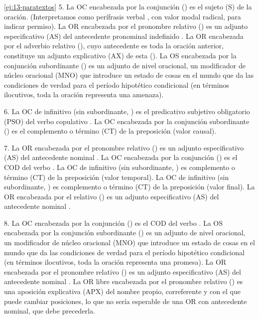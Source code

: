 \begin{solucion}{\ref{ej:13-paratextos}}
5. La OC encabezada por la conjunción  () es el sujeto (S) de la oración.
(Interpretamos como perífrasis verbal , con valor
modal radical, para indicar permiso). La OR encabezada por el pronombre relativo
 () es un adjunto
especificativo (AS) del antecedente pronominal indefinido . La OR
encabezada por el adverbio relativo  (), cuyo antecedente es toda la oración anterior, constituye un adjunto
explicativo (AX) de esta (). La OS encabezada por la conjunción subordinante
 () es un adjunto de nivel
oracional, un modificador de núcleo oracional (MNO) que introduce un estado de
cosas en el mundo que da las condiciones de verdad para el período hipotético
condicional (en términos ilocutivos, toda la oración representa una amenaza).

6. La OC de infinitivo (sin subordinante, ) es
el predicativo subjetivo obligatorio (PSO) del verbo copulativo . La
OC encabezada por la conjunción subordinante  () es el complemento o término (CT) de la preposición  (valor
causal).

7. La OR encabezada por el pronombre relativo  () es un adjunto especificativo (AS) del antecedente
nominal . La OC encabezada por la conjunción  () es el COD del verbo .
La OC de infinitivo (sin subordinante, ) es
complemento o término (CT) de la preposición  (valor temporal). La
OC de infinitivo (sin subordinante, ) es
complemento o término (CT) de la preposición  (valor final). La OR
encabezada por el relativo  ()
es un adjunto especificativo (AS) del antecedente nominal .

8. La OC encabezada por la conjunción  () es el COD del verbo . La OS encabezada por la
conjunción subordinante  () es
un adjunto de nivel oracional, un modificador de núcleo oracional (MNO) que
introduce un estado de cosas en el mundo que da las condiciones de verdad para
el período hipotético condicional (en términos ilocutivos, toda la oración
representa una promesa). La OR encabezada por el pronombre relativo 
() es un adjunto especificativo (AS) del antecedente nominal
. La OR libre encabezada por el pronombre relativo 
() es una aposición explicativa
(APX) del nombre propio, correferente y con el que puede cambiar posiciones, lo
que no sería esperable de una OR con antecedente nominal, que debe precederla.


\end{solucion}
